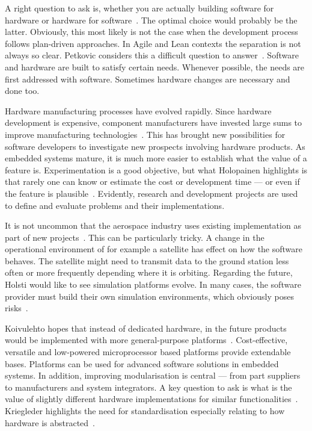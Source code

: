 \documentclass[english]{tktltiki2}
\begin{document}
A right question to ask is, whether you are actually building software for hardware or hardware for software~\cite{BT15}. The optimal choice would probably be the latter. Obviously, this most likely is not the case when the development process follows plan-driven approaches. In Agile and Lean contexts the separation is not always so clear. Petkovic considers this a difficult question to answer~\cite{Pet15}. Software and hardware are built to satisfy certain needs. Whenever possible, the needs are first addressed with software. Sometimes hardware changes are necessary and done too.

Hardware manufacturing processes have evolved rapidly. Since hardware development is expensive, component manufacturers have invested large sums to improve manufacturing technologies~\cite{Hol15a}. This has brought new possibilities for software developers to investigate new prospects involving hardware products. As embedded systems mature, it is much more easier to establish what the value of a feature is. Experimentation is a good objective, but what Holopainen highlights is that rarely one can know or estimate the cost or development time — or even if the feature is plausible~\cite{Hol15a}. Evidently, research and development projects are used to define and evaluate problems and their implementations.

It is not uncommon that the aerospace industry uses existing implementation as part of new projects~\cite{Hol15b}. This can be particularly tricky. A change in the operational environment of for example a satellite has effect on how the software behaves. The satellite might need to transmit data to the ground station less often or more frequently depending where it is orbiting. Regarding the future, Holsti would like to see simulation platforms evolve. In many cases, the software provider must build their own simulation environments, which obviously poses risks~\cite{Hol15b}.

Koivulehto hopes that instead of dedicated hardware, in the future products would be implemented with more general-purpose platforms~\cite{Koi15}. Cost-effective, versatile and low-powered microprocessor based platforms provide extendable bases. Platforms can be used for advanced software solutions in embedded systems. In addition, improving modularisation is central — from part suppliers to manufacturers and system integrators. A key question to ask is what is the value of slightly different hardware implementations for similar functionalities~\cite{Koi15}. Kriegleder highlights the need for standardisation especially relating to how hardware is abstracted~\cite{Kri15}.
\end{document}
